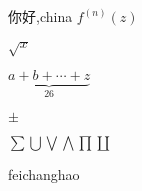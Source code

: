 \documentclass{article}
\begin{document}
你好,china
$f^{(n)}(z) $

$\sqrt{x} $

$\underbrace{a+b+\cdots+z}_{26} $

$\pm $

$\sum \bigcup \bigvee \bigwedge \prod \coprod $

feichanghao
\end{document}
